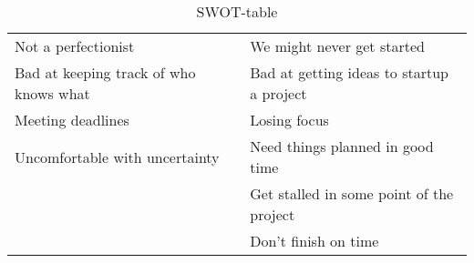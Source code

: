 \begin{table}[!ht]
\begin{tabular}{|p{}|p{}|}
Not a perfectionist                     & We might never get started\\
Bad at keeping track of who knows what  & Bad at getting ideas to startup a project\\ %
Meeting deadlines                       & Losing focus\\
Uncomfortable with uncertainty          & Need things planned in good time\\
                                        & Get stalled in some point of the project\\
                                        & Don't finish on time\\
\hline
\end{tabular}
\caption{SWOT-table}
\label{SWOT-table}
\end{table}